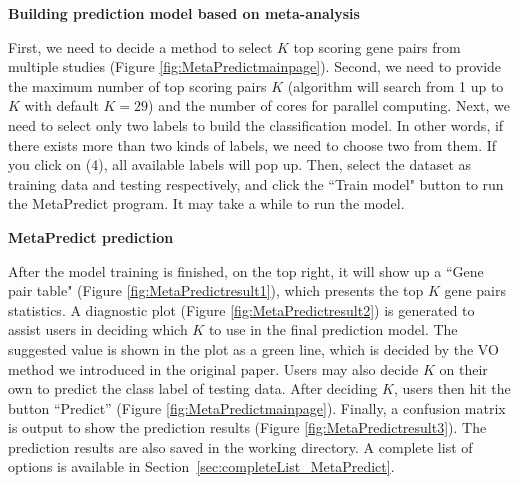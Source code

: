 \begin{steps}
\item \textbf{Building prediction model based on meta-analysis}

First, we need to decide a method to select $K$ top scoring gene pairs from multiple studies (Figure \ref{fig:MetaPredictmainpage}). 
Second, we need to provide the maximum number of top scoring pairs $K$ (algorithm will search from 1 up to $K$ with default $K = 29$) and the number of cores for parallel computing. 
Next, we need to select only two labels to build the classification model. 
In other words, if there exists more than two kinds of labels, we need to choose two from them. 
If you click on {\color{red} (4)}, all available labels will pop up.
Then, select the dataset as training data and testing respectively, 
and click the ``Train model" button to run the MetaPredict program. 
It may take a while to run the model.

\item \textbf{MetaPredict prediction}

After the model training is finished, on the top right, 
it will show up a ``Gene pair table" (Figure \ref{fig:MetaPredictresult1}), 
which presents the top $K$ gene pairs statistics. 
A diagnostic plot (Figure \ref{fig:MetaPredictresult2}) is generated to assist users in deciding which $K$ to use in the final prediction model. 
The suggested value is shown in the plot as a green line, 
which is decided by the VO method we introduced in the original paper. 
Users may also decide $K$ on their own to predict the class label of testing data. 
After deciding $K$, users then hit the button ``Predict'' (Figure \ref{fig:MetaPredictmainpage}). 
Finally, a confusion matrix is output to show the prediction results (Figure \ref{fig:MetaPredictresult3}).
The prediction results are also saved in the working directory.
A complete list of options is available in Section~\ref{sec:completeList_MetaPredict}.

\end{steps}


